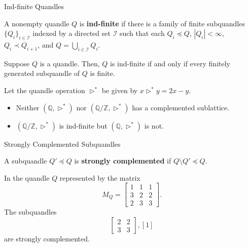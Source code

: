 \documentclass[10pt]{beamer}
\newcommand{\Z}{\mathbb{Z}}
\newcommand{\Q}{\mathbb{Q}}
\newcommand{\cI}{\mathcal{I}}
\newcommand{\sq}{\preccurlyeq} %
\newcommand{\thru}{\rhd} %
\newcommand{\psq}{\prec} %
\theoremstyle{plain}
\begin{document}
\begin{frame}{Ind-finite Quandles}

\begin{definition}
A nonempty quandle $Q$ is \textbf{ind-finite} if there is a family of finite subquandles $\{Q_i\}_{i \in \cI}$ indexed by a directed set $\cI$ such that each $Q_i\sq Q$, $|Q_i|<\infty$, $Q_i\psq Q_{i+1}$, and $Q=\bigcup_{i\in\cI} Q_i.$ 
\end{definition}    
\pause

\begin{lemma}
Suppose $Q$ is a quandle. Then, $Q$ is ind-finite if and only if every finitely generated subquandle of $Q$ is finite.
\end{lemma}
\pause

\begin{example}
Let the quandle operation $\thru^*$ be given by $x\thru^* y = 2x-y$.\\
\begin{itemize}
\item Neither $(\Q,\thru^*)$ nor $(\Q/\Z,\thru^*)$ has a complemented sublattice.
\item $(\Q / \Z, \thru^*)$ is ind-finite but $(\Q, \thru^*)$ is not.
\end{itemize}
\end{example}
\end{frame}

\begin{frame}{Strongly Complemented Subquandles}
\begin{definition}
A subquandle $Q'\sq Q$ is \textbf{strongly complemented} if $Q\setminus Q'\sq Q$.
\end{definition}

\begin{example}
In the quandle $Q$ represented by the matrix \[M_Q =\begin{bmatrix}
1 & 1 & 1\\
3 & 2 & 2\\
2 & 3 & 3
\end{bmatrix}.\]
The subquandles
\[\begin{bmatrix}2 & 2\\
3 & 3\end{bmatrix}, [1]\] are strongly complemented.

\end{example}
\end{frame}
\end{document}
